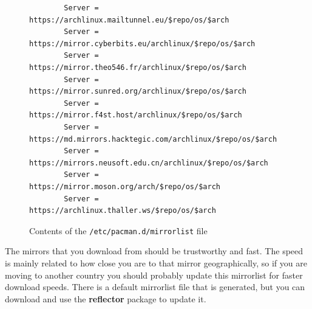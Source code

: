 \documentclass{article}
\begin{document}
    \begin{figure}
      \begin{lstlisting}
        Server = https://archlinux.mailtunnel.eu/$repo/os/$arch
        Server = https://mirror.cyberbits.eu/archlinux/$repo/os/$arch
        Server = https://mirror.theo546.fr/archlinux/$repo/os/$arch
        Server = https://mirror.sunred.org/archlinux/$repo/os/$arch
        Server = https://mirror.f4st.host/archlinux/$repo/os/$arch
        Server = https://md.mirrors.hacktegic.com/archlinux/$repo/os/$arch
        Server = https://mirrors.neusoft.edu.cn/archlinux/$repo/os/$arch
        Server = https://mirror.moson.org/arch/$repo/os/$arch
        Server = https://archlinux.thaller.ws/$repo/os/$arch
      \end{lstlisting}
      \caption{Contents of the \texttt{/etc/pacman.d/mirrorlist} file}\label{fig:mirrorlist}
    \end{figure}
    
    The mirrors that you download from should be trustworthy and fast. The speed is mainly related to how close you are to that mirror geographically, so if you are moving to another country you should probably update this mirrorlist for faster download speeds. There is a default mirrorlist file that is generated, but you can download and use the \textbf{reflector} package to update it.  
\end{document}
